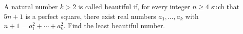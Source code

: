 A natural number $k>2$ is called beautiful if, for every integer $n\ge4$ such that $5n+1$ is a perfect square, there exist real numbers $a_1,\ldots,a_k$ with $n+1=a_1^2+\cdots+a_k^2$. Find the least beautiful number.
